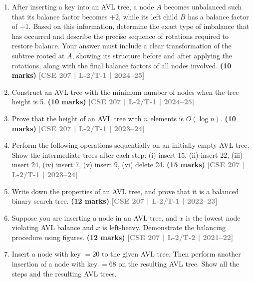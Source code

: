 \documentclass[12pt]{article}
\newcommand{\yr}[1]{\hfill\textcolor{gray}{\small\textbf{[#1]}}}
\newcommand{\mk}[1]{\textcolor{orange!70!black}{\small\textbf{(#1 marks)}}}
\begin{document}
\begin{enumerate}

\item After inserting a key into an AVL tree, a node $A$ becomes unbalanced such that its balance factor becomes $+2$, while its left child $B$ has a balance factor of $-1$. Based on this information, determine the exact type of imbalance that has occurred and describe the precise sequence of rotations required to restore balance. Your answer must include a clear transformation of the subtree rooted at $A$, showing its structure before and after applying the rotations, along with the final balance factors of all nodes involved.
\mk{10} \yr{CSE 207 | L-2/T-1 | 2024--25}


\item Construct an AVL tree with the minimum number of nodes when the tree height is 5.
\mk{10} \yr{CSE 207 | L-2/T-1 | 2024--25}


\item Prove that the height of an AVL tree with $n$ elements is $O(\log n)$.
\mk{10} \yr{CSE 207 | L-2/T-1 | 2023--24}


\item Perform the following operations sequentially on an initially empty AVL tree. Show the intermediate trees after each step: (i) insert 15, (ii) insert 22, (iii) insert 24, (iv) insert 7, (v) insert 9, (vi) delete 24.
\mk{15} \yr{CSE 207 | L-2/T-1 | 2023--24}


\item Write down the properties of an AVL tree, and prove that it is a balanced binary search tree.
\mk{12} \yr{CSE 207 | L-2/T-1 | 2022--23}


\item Suppose you are inserting a node in an AVL tree, and $x$ is the lowest node violating AVL balance and $x$ is left-heavy. Demonstrate the balancing procedure using figures.
\mk{12} \yr{CSE 207 | L-2/T-2 | 2021--22}


\item Insert a node with key $= 20$ to the given AVL tree. Then perform another insertion of a node with key $= 68$ on the resulting AVL tree. Show all the steps and the resulting AVL trees.
\begin{center}
\begin{tikzpicture}[
        every node/.style={circle, draw=black, thick, minimum size=0.8cm, font=\large, inner sep=0pt},
        edge/.style={thick, black}
    ]


\end{tikzpicture}
\end{center}
\end{enumerate}
\end{document}
